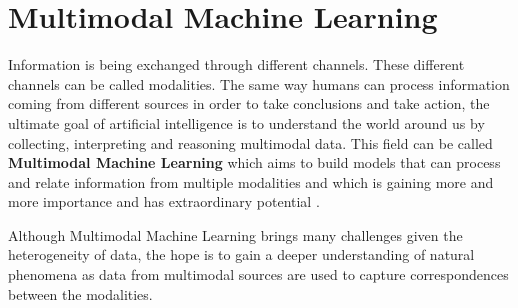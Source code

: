 
\section{Multimodal Machine Learning}
\label{sec:multiML}
\begin{comment}
Audiovisual emotion recognition \cite{Chao2016}, \cite{Corneanu2016survey}, \cite{Nicolle2012}, survey \cite{Zeng2009survey}\\

face analysis for speech detection (lip-reading, audio-visual speech):\\

A review of affective computing: From unimodal analysis to multimodal fusion\cite{Poria2017}\\

 eating condition audio-visual\cite{Schuller2015interspeech}

multimodal audio-video and physiological data AVEC2015 \cite{Ringeval2015}\\
\end{comment}


Information is being exchanged through different channels. These different channels can be called modalities. The same way humans can process information coming from different sources in order to take conclusions and take action, the ultimate goal of artificial intelligence is to understand the world around us by collecting, interpreting and reasoning multimodal data. This field can be called \textbf{Multimodal Machine Learning} which aims to build models that can process and relate information from multiple modalities and which is gaining more and more importance and has extraordinary potential \cite{Baltruvsaitis2017multimodal}.

Although Multimodal Machine Learning brings many challenges given the heterogeneity of data, the hope is to gain a deeper understanding of natural phenomena as data from multimodal sources are used to capture correspondences between the modalities.

